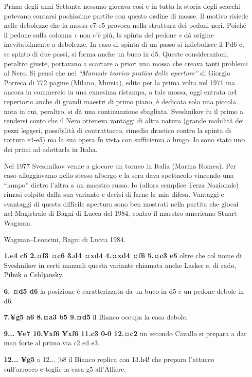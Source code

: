 \documentclass[
]{article}
\begin{document}
Prima degli anni Settanta nessuno giocava così e in tutta la storia
degli scacchi potevano contarsi pochissime partite con questo o¢dine di
mosse. Il motivo risiede nelle debolezze che la mossa e7-e5 provoca
nella struttura dei pedoni neri. Poiché il pedone sulla colonna \emph{c}
non c'è più, la spinta del pedone \emph{e} dà origine inevitabilmente a
debolezze. In caso di spinta di un passo si indebolisce il Pd6 e, se
spinto di due passi, si forma anche un buco in d5. Queste
considerazioni, peraltro giuste, portavano a scartare a priori una mossa
che creava tanti problemi al Nero. Si pensi che nel \emph{``Manuale
teorico pratico delle aperture''} di Giorgio Porreca di 772 pagine
(Milano, Mursia), edito per la prima volta nel 1971 ma ancora in
commercio in una ennesima ristampa, a tale mossa, oggi entrata nel
repertorio anche di grandi maestri di primo piano, è dedicata solo una
piccola nota in cui, peraltro, si dà una continuazione sbagliata.
Sveshnikov fu il primo a rendersi conto che il Nero otteneva vantaggi di
altra natura (grande mobilità dei pezzi leggeri, possibilità di
contrattacco, rimedio drastico contro la spinta di rottura e4-e5) ma la
sua opera fu vista con sufficienza a lungo. Io sono stato uno dei primi
ad adottarla in Italia.

Nel 1977 Sveshnikov venne a giocare un torneo in Italia (Marina Romea).
Per caso alloggiavamo nello stesso albergo e la sera dava spettacolo
vincendo una ``lampo'' dietro l'altra a un maestro russo. Io (allora
semplice Terza Nazionale) rimasi colpito dalla sua variante e decisi di
farne la mia difesa. Vantaggi e svantaggi di questa difficile apertura
sono ben mostrati nella partita che giocai nel Magistrale di Bagni di
Lucca del 1984, contro il maestro americano Stuart Wagman.

Wagman--Leoncini, Bagni di Lucca 1984.

\textbf{1.e4 c5 2.¤f3 ¤c6 3.d4 ¤xd4 4.¤xd4 ¤f6 5.¤c3 e5} oltre che col
nome di Sveshnikov in certi manuali questa variante chiamata anche
Lasker e, di rado, Pilnik o Cebljansky.

\textbf{6. ¤d5 d6} la posizione è caratterizzata da un buco in d5 e un
pedone debole in d6.

\textbf{7.¥g5 a6 8.¤a3 b5 9.¤d5} il Bianco occupa la casa debole.

\textbf{9... ¥e7 10.¥xf6 ¥xf6 11.c3 0-0 12.¤c2} un secondo Cavallo si
prepara a dar man forte al primo via c2 ed e3.

\textbf{12... ¥g5} a 12... ¦b8 il Bianco replica con 13.h4! che prepara
l'attacco sull'arrocco e toglie la casa g5 all'Alfiere.
\end{document}
